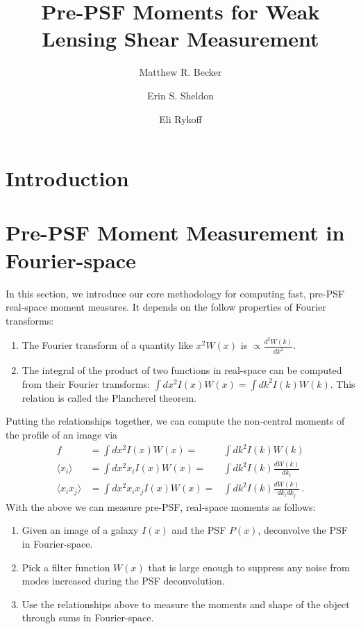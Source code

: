 \documentclass[twocolappendix, appendixfloats, numberedappendix, twocolumn, apj]{openjournal}
\begin{document}
\title{Pre-PSF Moments for Weak Lensing Shear Measurement}

\author{Matthew R. Becker}
\author{Erin S. Sheldon}
\author{Eli Rykoff}
\affil{}

\begin{abstract}
\end{abstract}

\section{Introduction}\label{sec:intro}

\section{Pre-PSF Moment Measurement in Fourier-space}

In this section, we introduce our core methodology for computing fast, pre-PSF real-space moment
measures. It depends on the follow properties of Fourier transforms:
\begin{enumerate}
\item The Fourier transform of a quantity like $x^2W(x)$ is $\propto\frac{d^{2}W(k)}{dk^2}$.
\item The integral of the product of two functions in real-space can be computed from their Fourier
      transforms: $\int dx^2 I(x)W(x) = \int dk^2 I(k)W(k)$. This relation is called the Plancherel theorem.
\end{enumerate}
Putting the relationships together, we can compute the non-central moments of the profile of
an image via
\begin{eqnarray}
f                          & = \int dx^2 I(x)W(x) =            & \int dk^2 I(k)W(k) \\
\langle x_{i} \rangle      & = \int dx^2 x_{i} I(x)W(x) =      & \int dk^2 I(k)\frac{dW(k)}{dk_i} \\
\langle x_{i}x_{j} \rangle & = \int dx^2 x_{i}x_{j} I(x)W(x) = & \int dk^2 I(k)\frac{dW(k)}{dk_{i}dk_{j}}\,.
\end{eqnarray}
With the above we can measure pre-PSF, real-space moments as follows:

\begin{enumerate}
\item Given an image of a galaxy $I(x)$ and the PSF $P(x)$, deconvolve the PSF in Fourier-space.
\item Pick a filter function $W(x)$ that is large enough to suppress any noise from modes increased
      during the PSF deconvolution.
\item Use the relationships above to measure the moments and shape of the object through sums in Fourier-space.
\end{enumerate}
\end{document}
